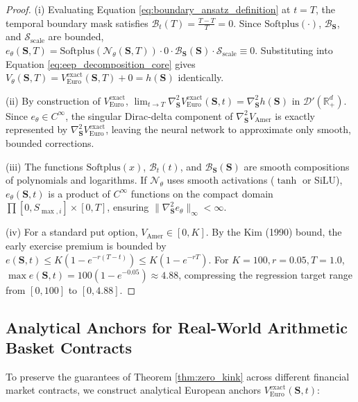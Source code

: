 \documentclass[11pt,a4paper]{article}
\begin{document}
\begin{proof}
(i) Evaluating Equation \eqref{eq:boundary_ansatz_definition} at $t=T$, the temporal boundary mask satisfies $\mathcal{B}_t(T) = \frac{T - T}{T} = 0$. Since $\text{Softplus}(\cdot)$, $\mathcal{B}_{\mathbf{S}}$, and $\mathcal{S}_{\text{scale}}$ are bounded, $e_\theta(\mathbf{S}, T) = \text{Softplus}(\mathcal{N}_\theta(\mathbf{S}, T)) \cdot 0 \cdot \mathcal{B}_{\mathbf{S}}(\mathbf{S}) \cdot \mathcal{S}_{\text{scale}} \equiv 0$. Substituting into Equation \eqref{eq:eep_decomposition_core} gives $V_\theta(\mathbf{S}, T) = V_{\text{Euro}}^{\text{exact}}(\mathbf{S}, T) + 0 = h(\mathbf{S})$ identically.

(ii) By construction of $V_{\text{Euro}}^{\text{exact}}$, $\lim_{t \to T} \nabla^2_{\mathbf{S}} V_{\text{Euro}}^{\text{exact}}(\mathbf{S}, t) = \nabla^2_{\mathbf{S}} h(\mathbf{S})$ in $\mathcal{D}'(\mathbb{R}_+^d)$. Since $e_\theta \in C^\infty$, the singular Dirac-delta component of $\nabla^2_{\mathbf{S}} V_{\text{Amer}}$ is exactly represented by $\nabla^2_{\mathbf{S}} V_{\text{Euro}}^{\text{exact}}$, leaving the neural network to approximate only smooth, bounded corrections.

(iii) The functions $\text{Softplus}(x)$, $\mathcal{B}_t(t)$, and $\mathcal{B}_{\mathbf{S}}(\mathbf{S})$ are smooth compositions of polynomials and logarithms. If $\mathcal{N}_\theta$ uses smooth activations ($\tanh$ or SiLU), $e_\theta(\mathbf{S}, t)$ is a product of $C^\infty$ functions on the compact domain $\prod [0, S_{\max, i}] \times [0, T]$, ensuring $\|\nabla^2_{\mathbf{S}} e_\theta\|_\infty < \infty$.

(iv) For a standard put option, $V_{\text{Amer}} \in [0, K]$. By the Kim (1990) bound, the early exercise premium is bounded by $e(\mathbf{S}, t) \le K(1 - e^{-r(T-t)}) \le K(1 - e^{-rT})$. For $K=100, r=0.05, T=1.0$, $\max e(\mathbf{S}, t) = 100(1 - e^{-0.05}) \approx 4.88$, compressing the regression target range from $[0, 100]$ to $[0, 4.88]$.
\end{proof}

\subsection{Analytical Anchors for Real-World Arithmetic Basket Contracts}
To preserve the guarantees of Theorem \ref{thm:zero_kink} across different financial market contracts, we construct analytical European anchors $V_{\text{Euro}}^{\text{exact}}(\mathbf{S}, t)$:
\end{document}
